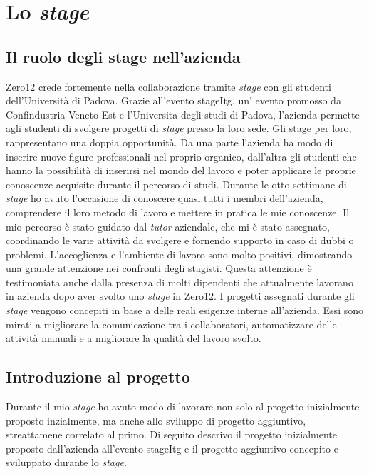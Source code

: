 
\chapter{Lo \textit{stage}}
\label{cap:lo-stage}



\section{Il ruolo degli stage nell'azienda}
Zero12 crede fortemente nella collaborazione tramite \textit{stage} con gli studenti dell'Università di Padova. Grazie all'evento \gls{stageItg}, un' evento promosso da Confindustria Veneto Est e l'Universita degli studi di Padova, l'azienda permette agli studenti di svolgere progetti di \textit{stage} presso la loro sede.
Gli stage per loro, rappresentano una doppia opportunità. Da una parte l’azienda ha modo di inserire nuove figure professionali nel proprio organico, dall’altra gli studenti che hanno la possibilità di inserirsi nel mondo del lavoro e poter applicare le proprie conoscenze acquisite durante il percorso di studi.
Durante le otto settimane di \textit{stage} ho avuto l’occasione di conoscere quasi tutti i membri dell’azienda, comprendere il loro metodo di lavoro e mettere in pratica le mie conoscenze. Il mio percorso è stato guidato dal \textit{tutor} aziendale, che mi è stato assegnato, coordinando le varie attività da svolgere e fornendo supporto in caso di dubbi o problemi. 
L'accoglienza e l'ambiente di lavoro sono molto positivi, dimostrando una grande attenzione nei confronti degli stagisti. 
Questa attenzione è testimoniata anche dalla presenza di molti dipendenti che attualmente lavorano in azienda dopo aver svolto uno \textit{stage} in Zero12.
I progetti assegnati durante gli \textit{stage} vengono concepiti in base a delle reali esigenze interne all’azienda. Essi sono mirati a migliorare la comunicazione tra i collaboratori, automatizzare delle attività manuali e a migliorare la qualità del lavoro svolto.

\section{Introduzione al progetto}
Durante il mio \textit{stage} ho avuto modo di lavorare non solo al progetto inizialmente proposto inzialmente, ma anche allo sviluppo di progetto aggiuntivo, streattamene correlato al primo.
Di seguito descrivo il progetto inizialmente proposto dall'azienda all'evento \gls{stageItg} e il progetto aggiuntivo concepito e sviluppato durante lo \textit{stage}.
